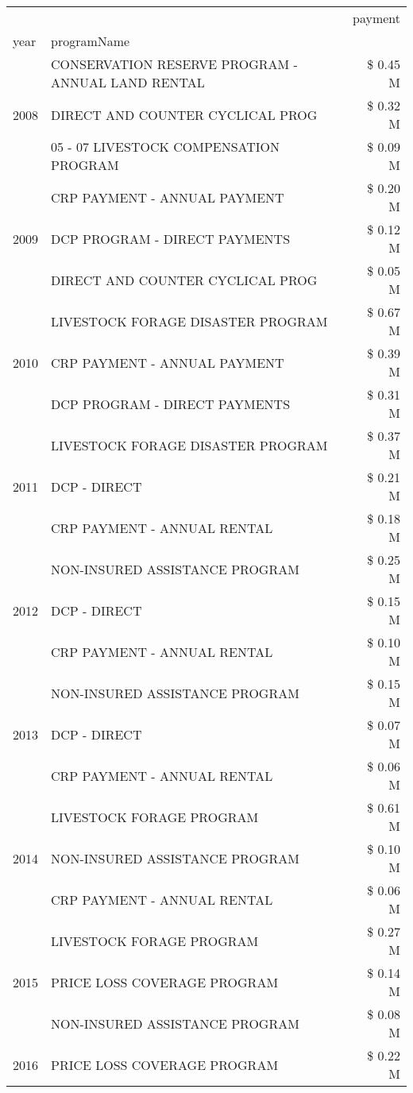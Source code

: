 \begin{tabular}{llr}
\toprule
 &  & payment \\
year & programName &  \\
\midrule
\multirow[t]{3}{*}{2008} & CONSERVATION RESERVE PROGRAM - ANNUAL LAND RENTAL & \$ 0.45 M \\
 & DIRECT AND COUNTER CYCLICAL PROG & \$ 0.32 M \\
 & 05 - 07 LIVESTOCK COMPENSATION PROGRAM & \$ 0.09 M \\
\cline{1-3}
\multirow[t]{3}{*}{2009} & CRP PAYMENT - ANNUAL PAYMENT & \$ 0.20 M \\
 & DCP PROGRAM - DIRECT PAYMENTS & \$ 0.12 M \\
 & DIRECT AND COUNTER CYCLICAL PROG & \$ 0.05 M \\
\cline{1-3}
\multirow[t]{3}{*}{2010} & LIVESTOCK FORAGE DISASTER  PROGRAM & \$ 0.67 M \\
 & CRP PAYMENT - ANNUAL PAYMENT & \$ 0.39 M \\
 & DCP PROGRAM - DIRECT PAYMENTS & \$ 0.31 M \\
\cline{1-3}
\multirow[t]{3}{*}{2011} & LIVESTOCK FORAGE DISASTER PROGRAM & \$ 0.37 M \\
 & DCP - DIRECT & \$ 0.21 M \\
 & CRP PAYMENT - ANNUAL RENTAL & \$ 0.18 M \\
\cline{1-3}
\multirow[t]{3}{*}{2012} & NON-INSURED ASSISTANCE PROGRAM & \$ 0.25 M \\
 & DCP - DIRECT & \$ 0.15 M \\
 & CRP PAYMENT - ANNUAL RENTAL & \$ 0.10 M \\
\cline{1-3}
\multirow[t]{3}{*}{2013} & NON-INSURED ASSISTANCE PROGRAM & \$ 0.15 M \\
 & DCP - DIRECT & \$ 0.07 M \\
 & CRP PAYMENT - ANNUAL RENTAL & \$ 0.06 M \\
\cline{1-3}
\multirow[t]{3}{*}{2014} & LIVESTOCK FORAGE PROGRAM & \$ 0.61 M \\
 & NON-INSURED ASSISTANCE PROGRAM & \$ 0.10 M \\
 & CRP PAYMENT - ANNUAL RENTAL & \$ 0.06 M \\
\cline{1-3}
\multirow[t]{3}{*}{2015} & LIVESTOCK FORAGE PROGRAM & \$ 0.27 M \\
 & PRICE LOSS COVERAGE PROGRAM & \$ 0.14 M \\
 & NON-INSURED ASSISTANCE PROGRAM & \$ 0.08 M \\
\cline{1-3}
\multirow[t]{3}{*}{2016} & PRICE LOSS COVERAGE PROGRAM & \$ 0.22 M \\

\end{tabular}
